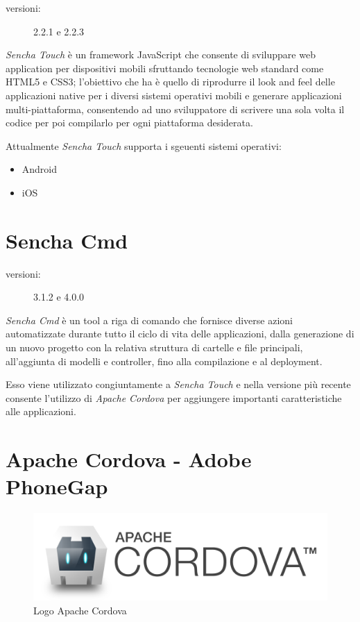\begin{description}
\item[versioni:] 2.2.1 e 2.2.3
\end{description}

\emph{Sencha Touch} è un framework JavaScript che consente di sviluppare web application per dispositivi mobili sfruttando tecnologie web standard come \acs{HTML5} e \acs{CSS3}; l'obiettivo che ha è quello di riprodurre il look and feel delle applicazioni native per i diversi sistemi operativi mobili e generare applicazioni multi-piattaforma, consentendo ad uno sviluppatore di scrivere una sola volta il codice per poi compilarlo per ogni piattaforma desiderata.

Attualmente \emph{Sencha Touch} supporta i sgeuenti sistemi operativi:
\begin{itemize}
\item Android
\item iOS
\end{itemize}

\section{Sencha Cmd}
\begin{description}
\item[versioni:] 3.1.2 e 4.0.0
\end{description}

\emph{Sencha Cmd} è un tool a riga di comando che fornisce diverse azioni automatizzate durante tutto il ciclo di vita delle applicazioni, dalla generazione di un nuovo progetto con la relativa struttura di cartelle e file principali, all'aggiunta di modelli e controller, fino alla compilazione e al deployment.

Esso viene utilizzato congiuntamente a \emph{Sencha Touch} e nella versione più recente consente l'utilizzo di \emph{Apache Cordova} per aggiungere importanti caratteristiche alle applicazioni.
 
\section{Apache Cordova - Adobe PhoneGap}
\begin{figure}[htb]
\centering
\includegraphics[scale=0.15]{gfx/cordova_logo_normal_dark}
\caption{Logo Apache Cordova}
\label{fig: logo cordova}
\end{figure}

